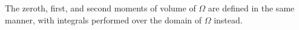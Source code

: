 The zeroth, first, and second moments of volume of $\Omega$ are defined in the same manner, with integrals performed over the domain of $\Omega$ instead.

